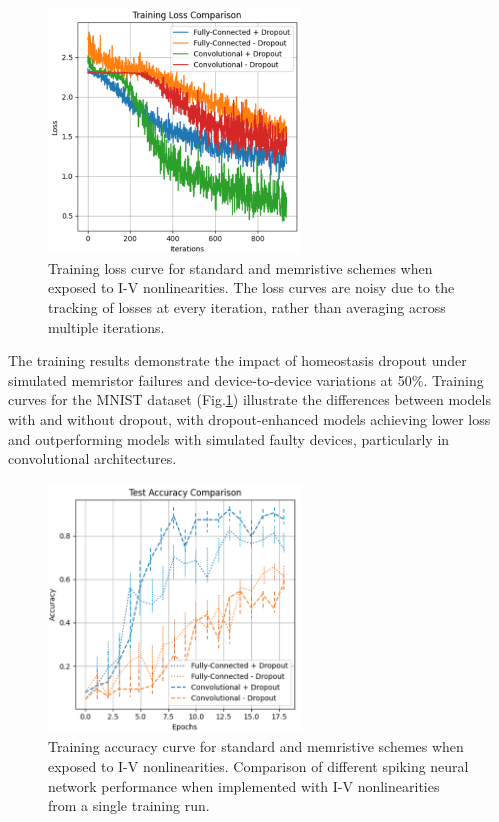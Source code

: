 \begin{figure}[!t]
    \centerline{\includegraphics[width=0.6\textwidth]{Chapter7/Figs/c.png}}
    \caption[Training loss curve for standard and memristive schemes when exposed to I-V nonlinearities]{Training loss curve for standard and memristive schemes when exposed to I-V nonlinearities. The loss curves are noisy due to the tracking of losses at every iteration, rather than averaging across multiple iterations.}
    \label{fig:7c}
\end{figure}


\noindent The training results demonstrate the impact of homeostasis dropout under simulated memristor failures and device-to-device variations at 50\%. Training curves for the MNIST dataset (Fig.\ref{fig:7c}) illustrate the differences between models with and without dropout, with dropout-enhanced models achieving lower loss and outperforming models with simulated faulty devices, particularly in convolutional architectures. \\

\begin{figure}[!t]
    \centerline{\includegraphics[width=0.6\textwidth]{Chapter7/Figs/d.png}}
    \caption[Training accuracy curve for standard and memristive schemes when exposed to I-V nonlinearities]{Training accuracy curve for standard and memristive schemes when exposed to I-V nonlinearities. Comparison of different spiking neural network performance when implemented with I-V nonlinearities from a single training run.}
    \label{fig:7d}
\end{figure}
    
